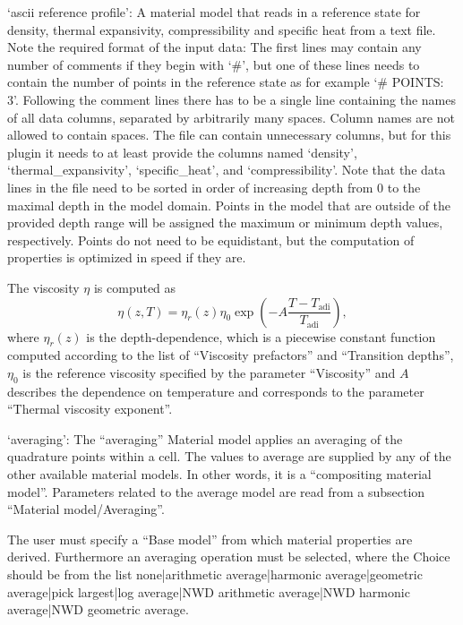 \begin{itemize}
`ascii reference profile': A material model that reads in a reference state for density, thermal expansivity, compressibility and specific heat from a text file. 
Note the required format of the input data: The first lines may contain any number of comments if they begin with `\#', but one of these lines needs to contain the number of points in the reference state as for example `\# POINTS: 3'. Following the comment lines there has to be a single line containing the names of all data columns, separated by arbitrarily many spaces. Column names are not allowed to contain spaces. The file can contain unnecessary columns, but for this plugin it needs to at least provide the columns named `density', `thermal\_expansivity', `specific\_heat', and `compressibility'. Note that the data lines in the file need to be sorted in order of increasing depth from 0 to the maximal depth in the model domain. Points in the model that are outside of the provided depth range will be assigned the maximum or minimum depth values, respectively. Points do not need to be equidistant, but the computation of properties is optimized in speed if they are.

The viscosity $\eta$ is computed as \begin{equation}\eta(z,T) = \eta_r(z) \eta_0 \exp\left(-A \frac{T - T_{\text{adi}}}{T_{\text{adi}}}\right),\end{equation}where $\eta_r(z)$ is the depth-dependence, which is a piecewise constant function computed according to the list of ``Viscosity prefactors'' and ``Transition depths'', $\eta_0$ is the reference viscosity specified by the parameter ``Viscosity'' and $A$ describes the dependence on temperature and corresponds to the parameter ``Thermal viscosity exponent''.

`averaging': The ``averaging'' Material model applies an averaging of the quadrature points within a cell. The values to average are supplied by any of the other available material models. In other words, it is a ``compositing material model''. Parameters related to the average model are read from a subsection ``Material model/Averaging''.

The user must specify a ``Base model'' from which material properties are derived. Furthermore an averaging operation must be selected, where the Choice should be from the list none|arithmetic average|harmonic average|geometric average|pick largest|log average|NWD arithmetic average|NWD harmonic average|NWD geometric average.


\end{itemize}
